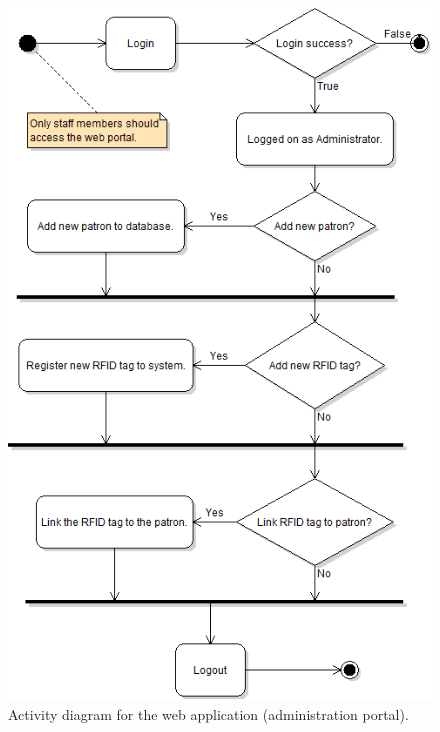 \documentclass[11pt,titlepage]{article} %
\begin{document}
\begin{figure}[H]
\centering
\includegraphics[scale=0.7]{WebAppActivity.png}
\caption{Activity diagram for the web application (administration portal).}
\end{figure}
\end{document}
